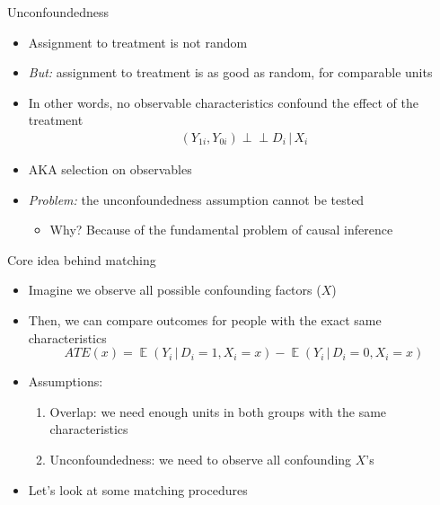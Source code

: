\documentclass[aspectratio=169,compress,handout,t,xcolor=table]{beamer}
\DeclareMathOperator{\E}{\mathbb{E}}                       %
\providecommand{\indep}{\perp \!\!\!\! \perp}              %
\begin{document}
\begin{frame}{Unconfoundedness}
  \begin{itemize}
    \item Assignment to treatment is not random
    \item \emph{But:} assignment to treatment is as good as random, for comparable units
    \item In other words, no observable characteristics confound the effect of the treatment
    \begin{align*}
      (Y_{1i}, Y_{0i}) \indep D_i \,|\, X_i
    \end{align*}
    \item AKA selection on observables
    \item \emph{Problem:} the unconfoundedness assumption cannot be tested
    \begin{itemize}
      \item Why? Because of the fundamental problem of causal inference
    \end{itemize}
  \end{itemize}
\end{frame}

\begin{frame}{Core idea behind matching}
  \begin{itemize}
    \item Imagine we observe all possible confounding factors (\(X\))
    \item Then, we can compare outcomes for people with the exact same characteristics
    \begin{equation*}
      ATE(x) = \E(Y_i \,|\, D_i=1, X_i=x) - \E(Y_i \,|\, D_i=0, X_i=x)
    \end{equation*}
    \item Assumptions:
    \begin{enumerate}
      \item Overlap: we need enough units in both groups with the same characteristics
      \item Unconfoundedness: we need to observe all confounding \(X\)'s
    \end{enumerate}
    \item Let's look at some matching procedures
  \end{itemize}
\end{frame}
\end{document}

